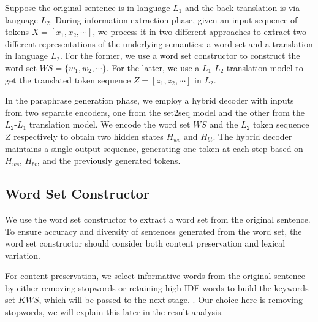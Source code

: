 
Suppose the original sentence is in language $L_1$ and the back-translation is via language $L_2$. During information extraction phase, given an input sequence of tokens $X = [x_1, x_2, \cdots]$, we process it in two different approaches to extract two different representations of the underlying semantics: a word set and a translation in language $L_2$. For the former, we use a word set constructor to construct the word set $WS = \{w_1, w_2,\cdots\}$. For the latter, we use a $L_1$-$L_2$ translation model to get the translated token sequence $Z = [z_1, z_2, \cdots]$ in $L_2$. 


In the paraphrase generation phase, we employ a hybrid decoder with inputs from two separate encoders, one from the set2seq model and the other from the $L_2$-$L_1$ translation model. We encode the word set $WS$ and the $L_2$ token sequence $Z$ respectively to obtain two hidden states $H_{ws}$ and $H_{bt}$. The hybrid decoder maintains a single output sequence, generating one token at each step based on $H_{ws}$, $H_{bt}$, and the previously generated tokens.


\subsection{Word Set Constructor} \label{sec:wordset}
We use the word set constructor to extract a word set from the original sentence. To ensure accuracy and diversity of sentences generated from the word set, the word set constructor should consider both content preservation and lexical variation.

For content preservation, we select informative words from the original 
sentence by either removing stopwords or retaining high-IDF words to build the 
keywords set $KWS$, which will be passed to the next stage. . Our choice here is removing stopwords, we will explain this later in the result analysis. 

